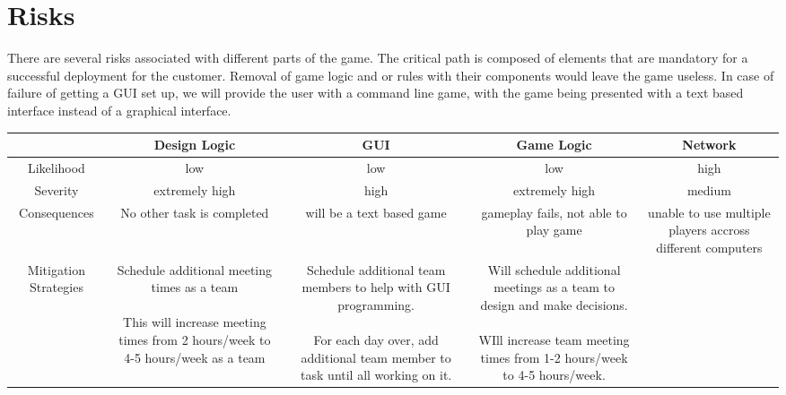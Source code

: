 \documentclass[11pt, titlepage]{article}
\begin{document}
    \section{Risks}

	    There are several risks associated with different parts of the game.
The critical path is composed of elements that are mandatory for a successful deployment for the customer. Removal of game logic and or rules with their components would leave the game useless.  In case of failure of getting a GUI set up, we will provide the user with a command line game, with the game being presented with a text based interface instead of a graphical interface.\\


				\begin{tabular}{| c | c | c | c | c |}
					\hline	 
						&\parbox{3cm}{Design Logic} 
						& \parbox{3cm}{GUI} 
						& \parbox{3cm}{Game Logic} 
						& \parbox{3cm}{Network} \\
					\hline	Likelihood 
						& low 
						& low 
						& low 
						& high \\
					\hline Severity 
						&extremely high 
						& high 
						& extremely high
						&  medium\\
					\hline Consequences 
						& \parbox{3cm}{No other task is completed} 
						& \parbox{3cm}{will be a text based game}
						& \parbox{3cm}{gameplay fails, not able to play game}
						& \parbox{3cm}{unable to use multiple players accross different computers} \\
					\hline Mitigation Strategies 
						& \parbox{3cm}{
									Schedule additional meeting times as a team
									\\ \\This will increase meeting times from 2 hours/week to 4-5 hours/week as a team
							}
						&  \parbox{3cm}{
									Schedule additional team members to help with GUI programming.
									\\ \\For each day over, add additional team member to task until all working on it.
							}
						& \parbox{3cm}{
								Will schedule additional meetings as a team to design and make decisions.
								\\ \\WIll increase team meeting times from 1-2 hours/week to 4-5 hours/week.
								} 
						&\\
					\hline
				\end{tabular}
\end{document}
